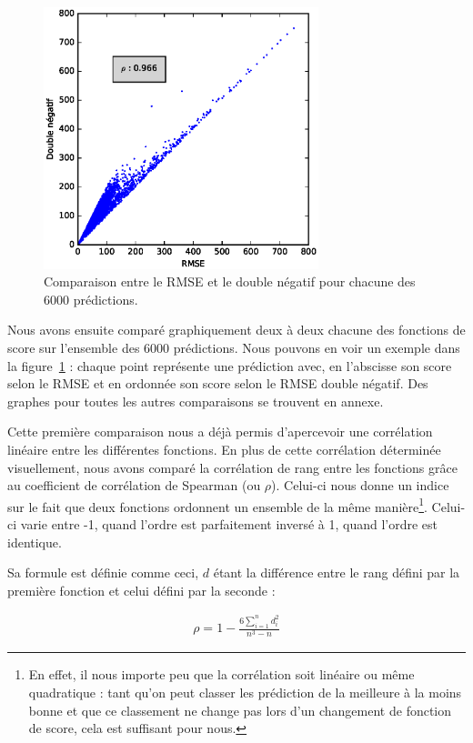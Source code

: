 \documentclass[letterpaper]{article}
\begin{document}
\begin{figure}
   \centerline{\includegraphics[width=8cm]{metrics.eps}}
   \caption{\label{fig:rmse-vs-double}Comparaison entre le RMSE et le double négatif pour chacune des 6000 prédictions.}
\end{figure}

Nous avons ensuite comparé graphiquement deux à deux chacune des fonctions de score sur l'ensemble des 6000 prédictions. Nous pouvons en voir un exemple dans la figure~\ref{fig:rmse-vs-double} : chaque point représente une prédiction avec, en l’abscisse son score selon le RMSE et en ordonnée son score selon le RMSE double négatif. Des graphes pour toutes les autres comparaisons se trouvent en annexe.

Cette première comparaison nous a déjà permis d'apercevoir une corrélation linéaire entre les différentes fonctions.
En plus de cette corrélation déterminée visuellement, nous avons comparé la corrélation de rang entre les fonctions grâce au coefficient de corrélation de Spearman (ou $\rho$). Celui-ci nous donne un indice sur le fait que deux fonctions ordonnent un ensemble de la même manière\footnote{En effet, il nous importe peu que la corrélation soit linéaire ou même quadratique : tant qu'on peut classer les prédiction de la meilleure à la moins bonne et que ce classement ne change pas lors d'un changement de fonction de score, cela est suffisant pour nous.}. Celui-ci varie entre -1, quand l'ordre est parfaitement inversé à 1, quand l'ordre est identique.

Sa formule est définie comme ceci, $d$ étant la différence entre le rang défini par la première fonction et celui défini par la seconde :

\begin{eqnarray}
\rho = 1 - \frac{6 \sum_{i=1}^{n} d^2_i}{n^3 - n}
\end{eqnarray}
\end{document}
